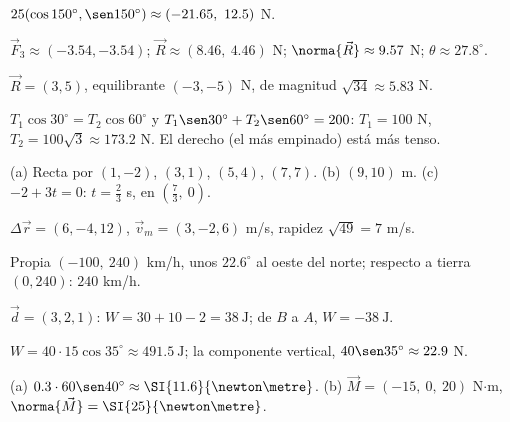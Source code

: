 \documentclass[11pt,a4paper]{article}
\newcommand{\vF}{\vec{F}}\newcommand{\vr}{\vec{r}}\newcommand{\vd}{\vec{d}}\newcommand{\vR}{\vec{R}}
\newcommand{\vM}{\vec{M}}
\begin{document}
\respuestas
\begin{respuestascortas}\raggedright
\begin{soluciones}
\item $25(\cos150^\circ,\sen150^\circ)\approx(-21.65,\ 12.5)$ N.
\item $\vF_3\approx(-3.54,-3.54)$; $\vR\approx(8.46,\ 4.46)$ N; $\norma{\vR}\approx9.57$ N; $\theta\approx27.8^\circ$.
\item $\vR=(3,5)$, equilibrante $(-3,-5)$ N, de magnitud $\sqrt{34}\approx5.83$ N.
\item $T_1\cos30^\circ=T_2\cos60^\circ$ y $T_1\sen30^\circ+T_2\sen60^\circ=200$: $T_1=100$ N, $T_2=100\sqrt3\approx173.2$ N.
  El derecho (el más empinado) está más tenso.
\item (a) Recta por $(1,-2)$, $(3,1)$, $(5,4)$, $(7,7)$. (b) $(9,10)$ m. (c) $-2+3t=0$: $t=\tfrac23$ s, en $\left(\tfrac73,\ 0\right)$.
\item $\Delta\vr=(6,-4,12)$, $\vec v_m=(3,-2,6)$ m/s, rapidez $\sqrt{49}=7$ m/s.
\item Propia $(-100,\ 240)$ km/h, unos $22.6^\circ$ al oeste del norte; respecto a tierra $(0,240)$: $240$ km/h.
\item $\vd=(3,2,1)$: $W=30+10-2=\SI{38}{\joule}$; de $B$ a $A$, $W=\SI{-38}{\joule}$.
\item $W=40\cdot15\cos35^\circ\approx\SI{491.5}{\joule}$; la componente vertical, $40\sen35^\circ\approx22.9$ N.
\item (a) $0.3\cdot60\sen40^\circ\approx\SI{11.6}{\newton\metre}$. (b) $\vM=(-15,\ 0,\ 20)$ N$\cdot$m, $\norma{\vM}=\SI{25}{\newton\metre}$.
\end{soluciones}
\end{respuestascortas}
\end{document}
